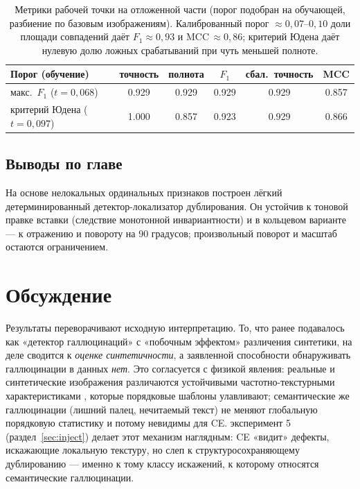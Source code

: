 \documentclass[14pt]{extarticle}
\theoremstyle{plain}
\numberwithin{equation}{section}
\numberwithin{figure}{section}
\numberwithin{table}{section}
\begin{document}
\begin{table}[h!]
\centering
\caption{Метрики рабочей точки на отложенной части (порог подобран на обучающей,
разбиение по базовым изображениям). Калиброванный порог $\approx0{,}07$--$0{,}10$
доли площади совпадений даёт $F_1\approx0{,}93$ и MCC$\,\approx0{,}86$; критерий
Юдена даёт нулевую долю ложных срабатываний при чуть меньшей полноте.}
\label{tab:thr}
\begin{tabular}{@{}lccccc@{}}
\toprule
Порог (обучение) & точность & полнота & $F_1$ & сбал.\ точность & MCC \\
\midrule
макс.\ $F_1$ ($t=0{,}068$)   & 0.929 & 0.929 & 0.929 & 0.929 & 0.857 \\
критерий Юдена ($t=0{,}097$) & 1.000 & 0.857 & 0.923 & 0.929 & 0.866 \\
\bottomrule
\end{tabular}

\end{table}

\subsection*{Выводы по главе}
На основе нелокальных ординальных признаков построен лёгкий детерминированный
детектор-локализатор дублирования. Он устойчив к тоновой правке вставки (следствие
монотонной инвариантности) и в кольцевом варианте — к отражению и повороту на
90 градусов; произвольный поворот и масштаб остаются ограничением.

\section{Обсуждение}\label{sec:discussion}

Результаты переворачивают исходную интерпретацию. То, что ранее подавалось как
«детектор галлюцинаций» с «побочным эффектом» различения синтетики, на деле
сводится к \emph{оценке синтетичности}, а заявленной способности обнаруживать
галлюцинации в данных \emph{нет}. Это согласуется с физикой явления: реальные и
синтетические изображения различаются устойчивыми частотно-текстурными
характеристиками \citep{corvi2023detection}, которые порядковые шаблоны улавливают;
семантические же галлюцинации (лишний палец, нечитаемый текст) не меняют
глобальную порядковую статистику и потому невидимы для CE. эксперимент 5
(раздел~\ref{sec:inject}) делает этот механизм наглядным: CE «видит» дефекты,
искажающие локальную текстуру, но слеп к структуросохраняющему дублированию —
именно к тому классу искажений, к которому относятся семантические галлюцинации.
\end{document}
